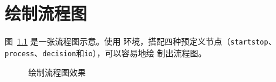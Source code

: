 \chapter{绘制流程图}

图~\ref{fig:flow_chart} 是一张流程图示意。使用  环境，搭配四种预定义节点（\verb+startstop+、\verb+process+、\verb+decision+和\verb+io+），可以容易地绘
制出流程图。

\begin{figure}[!htp]
  \centering
  \resizebox{6cm}{!}{}
  \caption{绘制流程图效果}
  \label{fig:flow_chart}
\end{figure}